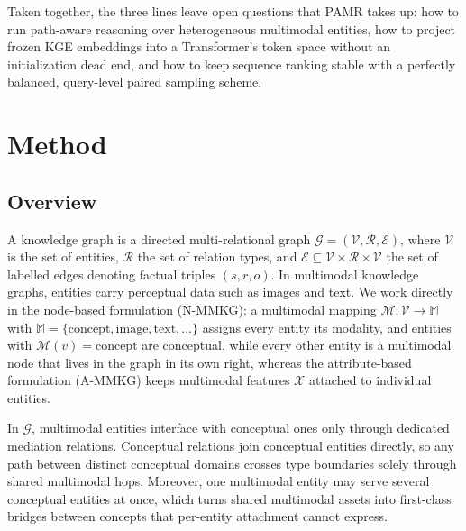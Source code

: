 \documentclass[runningheads]{llncs}
\begin{document}

Taken together, the three lines leave open questions that PAMR takes up: how to run path-aware reasoning over heterogeneous multimodal entities, how to project frozen KGE embeddings into a Transformer's token space without an initialization dead end, and how to keep sequence ranking stable with a perfectly balanced, query-level paired sampling scheme.

\section{Method}
\label{sec:method}
\subsection{Overview}
\label{sec:overview}

A knowledge graph is a directed multi-relational graph
$\mathcal{G} = (\mathcal{V}, \mathcal{R}, \mathcal{E})$, where $\mathcal{V}$
is the set of entities, $\mathcal{R}$ the set of relation types, and
$\mathcal{E} \subseteq \mathcal{V} \times \mathcal{R} \times \mathcal{V}$ the
set of labelled edges denoting factual triples $(s, r, o)$. In multimodal
knowledge graphs, entities carry perceptual data such as images and text.
We work directly in the node-based formulation (N-MMKG): a multimodal
mapping $\mathcal{M}: \mathcal{V} \rightarrow \mathbb{M}$ with
$\mathbb{M} = \{\text{concept}, \text{image}, \text{text}, \ldots\}$
assigns every entity its modality, and entities with
$\mathcal{M}(v) = \text{concept}$ are conceptual, while every other
entity is a multimodal node that lives in the graph in its own right,
whereas the attribute-based formulation (A-MMKG) keeps multimodal
features $\mathcal{X}$ attached to individual entities.

In $\mathcal{G}$, multimodal entities interface with conceptual ones
only through dedicated mediation relations. Conceptual relations join
conceptual entities directly, so any path between distinct conceptual
domains crosses type boundaries solely through shared multimodal hops.
Moreover, one multimodal entity may serve several conceptual entities
at once, which turns shared multimodal assets into first-class bridges
between concepts that per-entity attachment cannot express.
\end{document}
